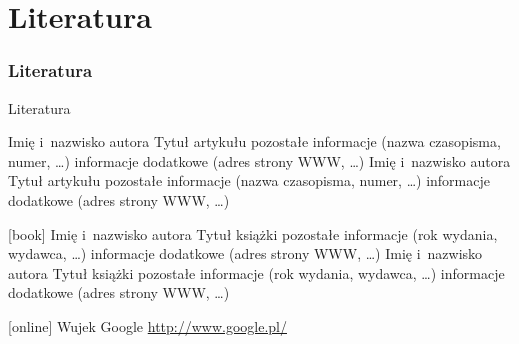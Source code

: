 \documentclass[polish,xcolor=table,9pt,aspectratio=1610,hyperref={pdfpagemode=FullScreen}]{beamer}
\begin{document}
\part{Literatura}
\section*{Literatura}
\begin{frame}[allowframebreaks]{Literatura}
\begin{thebibliography}{}
      Imię i~nazwisko autora 
      \newblock
      Tytuł artykułu 
      \newblock 
      pozostałe informacje (nazwa czasopisma, numer, \ldots) 
      \newblock
      informacje dodatkowe (adres strony WWW, \ldots)
      Imię i~nazwisko autora 
      \newblock 
      Tytuł artykułu 
      \newblock
      pozostałe informacje (nazwa czasopisma, numer, \ldots)
      \newblock informacje dodatkowe (adres strony WWW, \ldots)
    
  [book]
      Imię i~nazwisko autora
      \newblock
      Tytuł książki
      \newblock
      pozostałe informacje (rok wydania, wydawca, \ldots)
      \newblock informacje dodatkowe (adres strony WWW, \ldots)
      Imię i~nazwisko autora
      \newblock 
      Tytuł książki
      \newblock
      pozostałe informacje (rok wydania, wydawca, \ldots)
      \newblock informacje dodatkowe (adres strony WWW, \ldots)
    
  [online]
      Wujek Google
      \newblock
      \url{http://www.google.pl/}
\end{thebibliography}
%
%
\end{frame}
\end{document}
